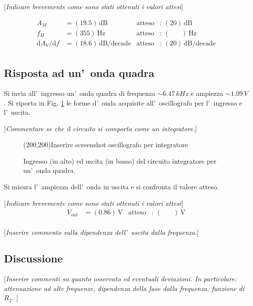 \documentclass[10pt,a4paper]{article}
\newcommand{\rem}[1]{[\emph{#1}]}
\newcommand{\exn}{\phantom{xxx}}
\begin{document}
\rem{Indicare brevemente come sono stati ottenuti i valori attesi}

\begin{align*}
A_M &= (19.5)\,\mathrm{dB} & \mathrm{atteso} &:\,(20  )\, \mathrm{dB}  \\
f_H &= (355)\,\mathrm{Hz} & \mathrm{atteso} &:\,(\exn  )\, \mathrm{Hz} \\
{\mathrm{d}A_V}/{\mathrm{d}f} &= (18.6)\,\mathrm{dB/decade} & \mathrm{atteso} &:\,(20 )\, \mathrm{dB/decade}  \\
\end{align*}


%
\subsection*{Risposta ad un'~onda quadra}
Si invia all'~ingresso un'~onda quadra di frequenza $\sim 6.47\,kHz$ e ampiezza $\sim 1.09\,V$.
Si riporta in Fig. \ref{fig:oscinte} le forme d'~onda acquisite all'~oscillografo per l'~ingresso
e l'~uscita. 

\rem{Commentare se che il circuito si comporta come un integratore.}
%
\begin{figure}[htb]
\begin{center}
\framebox(200,200){Inserire screenshot oscillografo per integratore}
\end{center}
\caption{\small Ingresso (in alto) ed uscita (in basso) del circuito integratore per un'~onda quadra.}
\label{fig:oscinte}
\end{figure}
%

Si misura l'~ampiezza dell'~onda  in uscita e si confronta il valore atteso.

\rem{Indicare brevemente come sono stati ottenuti i valori attesi}
\begin{align*}
V_{out} &= (0.86 )\,\mathrm{V} & \mathrm{atteso} &:\,(\exn  )\, \mathrm{V}  \\
\end{align*}

\rem{Inserire commento sulla dipendenza dell'~uscita dalla frequenza.}
%

\subsection{Discussione}

\rem{Inserire commenti su quanto osservato ed eventuali deviazioni. 
In particolare: attenuazione ad alte frequenze, dipendenza della fase dalla frequenza, funzione di $R_2$. }

\end{document}
